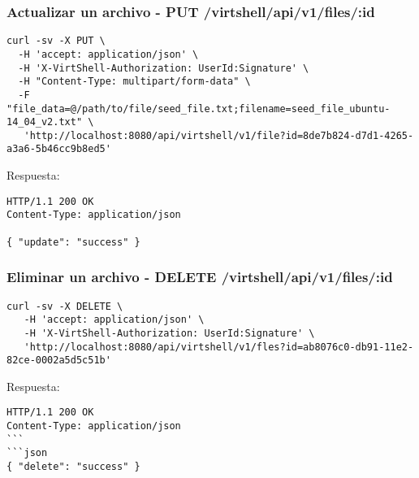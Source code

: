 \subsubsection{Actualizar un archivo - PUT /virtshell/api/v1/files/:id}

\begin{lstlisting}[style=json]
curl -sv -X PUT \
  -H 'accept: application/json' \
  -H 'X-VirtShell-Authorization: UserId:Signature' \
  -H "Content-Type: multipart/form-data" \
  -F "file_data=@/path/to/file/seed_file.txt;filename=seed_file_ubuntu-14_04_v2.txt" \
   'http://localhost:8080/api/virtshell/v1/file?id=8de7b824-d7d1-4265-a3a6-5b46cc9b8ed5'
\end{lstlisting}

\vspace{1cm}
Respuesta:
\vspace{1cm}

\begin{lstlisting}[style=json]
HTTP/1.1 200 OK
Content-Type: application/json

{ "update": "success" }
\end{lstlisting}


\subsubsection{Eliminar un archivo - DELETE /virtshell/api/v1/files/:id}

\begin{lstlisting}[style=json]
curl -sv -X DELETE \
   -H 'accept: application/json' \
   -H 'X-VirtShell-Authorization: UserId:Signature' \
   'http://localhost:8080/api/virtshell/v1/fles?id=ab8076c0-db91-11e2-82ce-0002a5d5c51b'
\end{lstlisting}

\vspace{1cm}
Respuesta:
\vspace{1cm}

\begin{lstlisting}[style=json]
HTTP/1.1 200 OK
Content-Type: application/json
```
```json
{ "delete": "success" }
\end{lstlisting}
